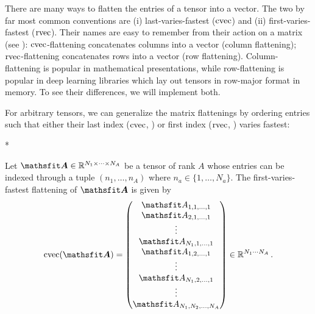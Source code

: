 There are many ways to flatten the entries of a tensor into a vector.
The two by far most common conventions are (i) last-varies-fastest ($\operatorname{cvec}$) and (ii) first-varies-fastest ($\operatorname{rvec}$).
Their names are easy to remember from their action on a matrix (see ): $\operatorname{cvec}$-flattening concatenates columns into a vector (column flattening); $\operatorname{rvec}$-flattening concatenates rows into a vector (row flattening).
Column-flattening is popular in mathematical presentations, while row-flattening is popular in deep learning libraries which lay out tensors in row-major format in memory.
To see their differences, we will implement both.

For arbitrary tensors, we can generalize the matrix flattenings by ordering entries such that either their last index ($\operatorname{cvec}$, ) or first index ($\operatorname{rvec}$, ) varies fastest:

\switchcolumn[1]*
\switchcolumn[0]

\begin{definition}\label{def:cvec}
  Let $\tA \in \sR^{N_1 \times \dots \times N_A}$ be a tensor of rank $A$ whose entries can be indexed through a tuple $(n_1, \dots, n_A)$ where $n_a \in \{1, \dots, N_a\}$.
  The first-varies-fastest flattening of $\tA$ is given by
  \begin{align*}
    \cvec(\tA) =
    \begin{pmatrix}
      \etA_{1,1,\dots,1} \\
      \etA_{2,1,\dots,1} \\
      \vdots \\
      \etA_{N_1,1,\dots,1} \\
      \etA_{1,2,\dots,1} \\
      \vdots \\
      \etA_{N_1,2,\dots,1} \\
      \vdots \\
      \etA_{N_1,N_2,\dots,N_A}
    \end{pmatrix}
    \in \sR ^{N_1 \cdots N_A}\,.
  \end{align*}
\end{definition}

